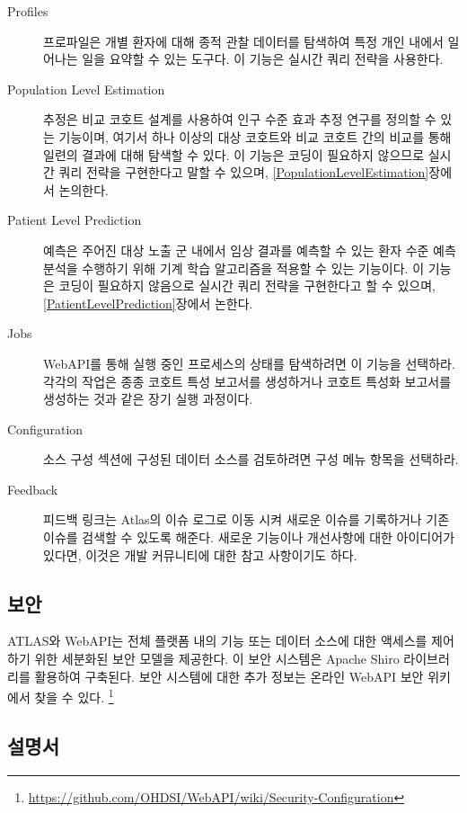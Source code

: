 \documentclass[11pt]{book}
\let\rmarkdownfootnote\footnote%
\def\footnote{\protect\rmarkdownfootnote}
\theoremstyle{definition}
\theoremstyle{definition}
\theoremstyle{definition}
\theoremstyle{remark}
\begin{document}
\begin{description}
\item[Profiles ]
프로파일은 개별 환자에 대해 종적 관찰 데이터를 탐색하여 특정 개인 내에서
일어나는 일을 요약할 수 있는 도구다. 이 기능은 실시간 쿼리 전략을
사용한다.
\item[Population Level Estimation
]
추정은 비교 코호트 설계를 사용하여 인구 수준 효과 추정 연구를 정의할 수
있는 기능이며, 여기서 하나 이상의 대상 코호트와 비교 코호트 간의 비교를
통해 일련의 결과에 대해 탐색할 수 있다. 이 기능은 코딩이 필요하지
않으므로 실시간 쿼리 전략을 구현한다고 말할 수 있으며,
\ref{PopulationLevelEstimation}장에서 논의한다.
\item[Patient Level Prediction ]
예측은 주어진 대상 노출 군 내에서 임상 결과를 예측할 수 있는 환자 수준
예측 분석을 수행하기 위해 기계 학습 알고리즘을 적용할 수 있는 기능이다.
이 기능은 코딩이 필요하지 않음으로 실시간 쿼리 전략을 구현한다고 할 수
있으며, \ref{PatientLevelPrediction}장에서 논한다.
\item[Jobs ]
WebAPI를 통해 실행 중인 프로세스의 상태를 탐색하려면 이 기능을 선택하라.
각각의 작업은 종종 코호트 특성 보고서를 생성하거나 코호트 특성화
보고서를 생성하는 것과 같은 장기 실행 과정이다.
\item[Configuration ]
소스 구성 섹션에 구성된 데이터 소스를 검토하려면 구성 메뉴 항목을
선택하라.
\item[Feedback ]
피드백 링크는 Atlas의 이슈 로그로 이동 시켜 새로운 이슈를 기록하거나
기존 이슈를 검색할 수 있도록 해준다. 새로운 기능이나 개선사항에 대한
아이디어가 있다면, 이것은 개발 커뮤니티에 대한 참고 사항이기도 하다.
\end{description}

\subsection{보안}

ATLAS와 WebAPI는 전체 플랫폼 내의 기능 또는 데이터 소스에 대한 액세스를
제어하기 위한 세분화된 보안 모델을 제공한다. 이 보안 시스템은 Apache
Shiro 라이브러리를 활용하여 구축된다. 보안 시스템에 대한 추가 정보는
온라인 WebAPI 보안 위키에서 찾을 수 있다. \footnote{\url{https://github.com/OHDSI/WebAPI/wiki/Security-Configuration}}

\subsection{설명서}
\end{document}
